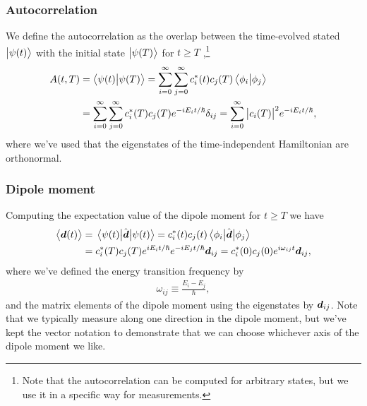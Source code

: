            \subsubsection{Autocorrelation}
                We define the autocorrelation as the overlap between the
                time-evolved stated $\ket{\psi(t)}$ with the initial state
                $\ket{\psi(T)}$ for $t \geq T$ \cite{robinett20041,
                pedersen2018symplectic},\footnote{%
                    Note that the autocorrelation can be computed for arbitrary
                    states, but we use it in a specific way for measurements.
                }
                \begin{align}
                    A(t, T)
                    &= \braket{\psi(t)}{\psi(T)}
                    =
                    \sum_{i = 0}^{\infty}
                    \sum_{j = 0}^{\infty}
                    c^{*}_i(t) c_j(T)
                    \braket{\phi_i}{\phi_j}
                    \\
                    &=
                    \sum_{i = 0}^{\infty}
                    \sum_{j = 0}^{\infty}
                    c^{*}_i(T) c_j(T) e^{-i E_i t/\hslash}
                    \delta_{ij}
                    =
                    \sum_{i = 0}^{\infty}
                    \abs{c_i(T)}^2 e^{-i E_i t/\hslash},
                    \label{eq:autocorrelation}
                \end{align}
                where we've used that the eigenstates of the time-independent
                Hamiltonian are orthonormal.

            \subsubsection{Dipole moment}
                Computing the expectation value of the dipole moment for $t \geq
                T$ we have
                \begin{align}
                    \expval{\boldsymbol{d}(t)}
                    &= \mel{\psi(t)}{\hat{\boldsymbol{d}}}{\psi(t)}
                    =
                    c^{*}_i(t)c_j(t)\mel{\phi_i}{\hat{\boldsymbol{d}}}{\phi_j}
                    \\
                    &=
                    c^{*}_i(T)c_j(T) e^{i E_i t/\hslash}
                    e^{-i E_j t / \hslash}
                    \boldsymbol{d}_{ij}
                    =
                    c^{*}_i(0)c_j(0) e^{i \omega_{ij} t}
                    \boldsymbol{d}_{ij},
                \end{align}
                where we've defined the energy transition frequency by
                \begin{align}
                    \omega_{ij} \equiv \frac{E_i - E_j}{\hslash},
                \end{align}
                and the matrix elements of the dipole moment using the
                eigenstates by $\boldsymbol{d}_{ij}$.
                Note that we typically measure along one direction in the dipole
                moment, but we've kept the vector notation to demonstrate that
                we can choose whichever axis of the dipole moment we like.

